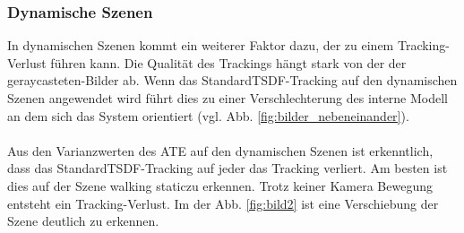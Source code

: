 \documentclass[12pt,DIV=15,BCOR=15mm,twoside,headsepline,abstract=true,listof=totoc,bibliography=totoc]{scrreprt}
\theoremstyle{remark}    %
\begin{document}
    \subsubsection{Dynamische Szenen}
    In dynamischen Szenen kommt ein weiterer Faktor dazu, der zu einem Tracking-Verlust führen kann. Die Qualität des Trackings hängt stark von der der 
    geraycasteten-Bilder ab. Wenn das \glqq Standard\grqq \ac{TSDF}-Tracking auf den dynamischen Szenen angewendet wird führt dies zu einer Verschlechterung des 
    interne Modell an dem sich das System orientiert (vgl. Abb. \ref{fig:bilder_nebeneinander}).\\\\
    Aus den Varianzwerten des \ac{ATE} auf den dynamischen Szenen ist erkenntlich, dass das \glqq Standard\grqq \ac{TSDF}-Tracking auf jeder das Tracking 
    verliert. Am besten ist dies auf der Szene
    \glqq walking static\grqq zu erkennen. Trotz keiner Kamera Bewegung entsteht ein Tracking-Verlust. Im der Abb. \ref{fig:bild2} ist eine Verschiebung der Szene
    deutlich zu erkennen. \\\\
\end{document}
